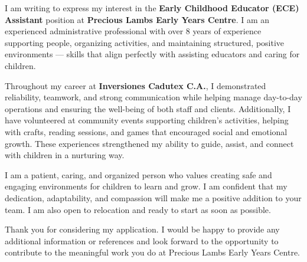 \documentclass[11pt, a4paper]{awesome-cv}
\begin{document}
\makecvheader[R]
\makelettertitle

\begin{cvletter}

I am writing to express my interest in the \textbf{Early Childhood Educator (ECE) Assistant} position at \textbf{Precious Lambs Early Years Centre}. I am an experienced administrative professional with over 8 years of experience supporting people, organizing activities, and maintaining structured, positive environments — skills that align perfectly with assisting educators and caring for children.

Throughout my career at \textbf{Inversiones Cadutex C.A.}, I demonstrated reliability, teamwork, and strong communication while helping manage day-to-day operations and ensuring the well-being of both staff and clients. Additionally, I have volunteered at community events supporting children’s activities, helping with crafts, reading sessions, and games that encouraged social and emotional growth. These experiences strengthened my ability to guide, assist, and connect with children in a nurturing way.

I am a patient, caring, and organized person who values creating safe and engaging environments for children to learn and grow. I am confident that my dedication, adaptability, and compassion will make me a positive addition to your team. I am also open to relocation and ready to start as soon as possible.

Thank you for considering my application. I would be happy to provide any additional information or references and look forward to the opportunity to contribute to the meaningful work you do at Precious Lambs Early Years Centre.

\end{cvletter}

\makeletterclosing
\end{document}
